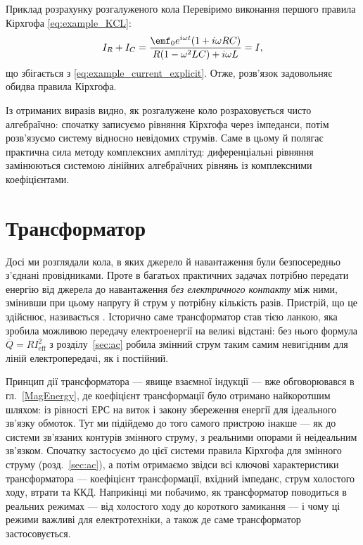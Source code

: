 \begin{Example}{Приклад розрахунку розгалуженого кола}
Перевіримо виконання першого правила Кірхгофа \eqref{eq:example_KCL}:
\begin{equation*}
	I_R + I_C = \frac{\emf_0 e^{i\omega t}(1 + i\omega RC)}{R(1 - \omega^2 LC) + i\omega L} = I,
\end{equation*}
що збігається з \eqref{eq:example_current_explicit}. Отже, розв'язок задовольняє обидва правила Кірхгофа.

Із отриманих виразів видно, як розгалужене коло розраховується чисто алгебраїчно: спочатку записуємо рівняння Кірхгофа через імпеданси, потім розв'язуємо систему відносно невідомих струмів. Саме в цьому й полягає практична сила методу комплексних амплітуд: диференціальні рівняння замінюються системою лінійних алгебраїчних рівнянь із комплексними коефіцієнтами.
\end{Example}

\section{Трансформатор}
\label{sec:transformer}

Досі ми розглядали кола, в яких джерело й навантаження були
безпосередньо з'єднані провідниками. Проте в багатьох практичних
задачах потрібно передати енергію від джерела до навантаження
\emph{без електричного контакту} між ними, змінивши при цьому
напругу й струм у потрібну кількість разів. Пристрій, що це
здійснює, називається . Історично саме
трансформатор став тією ланкою, яка зробила можливою передачу
електроенергії на великі відстані: без нього формула
$\overline{Q}=RI_{\text{eff}}^2$ з розділу~\ref{sec:ac} робила
змінний струм таким самим невигідним для ліній електропередачі,
як і постійний.

Принцип дії трансформатора --- явище взаємної індукції --- вже
обговорювався в гл.~\ref{MagEnergy}, де коефіцієнт трансформації
було отримано найкоротшим шляхом: із рівності ЕРС на виток і
закону збереження енергії для ідеального зв'язку обмоток. Тут
ми підійдемо до того самого пристрою інакше --- як до системи
зв'язаних контурів змінного струму, з реальними опорами й
неідеальним зв'язком. Спочатку застосуємо до цієї системи правила
Кірхгофа для змінного струму (розд.~\ref{sec:ac}), а потім
отримаємо звідси всі ключові характеристики трансформатора ---
коефіцієнт трансформації, вхідний імпеданс, струм холостого
ходу, втрати та ККД. Наприкінці ми побачимо, як трансформатор
поводиться в реальних режимах --- від холостого ходу до
короткого замикання --- і чому ці режими важливі для
електротехніки, а також де саме трансформатор застосовується.

